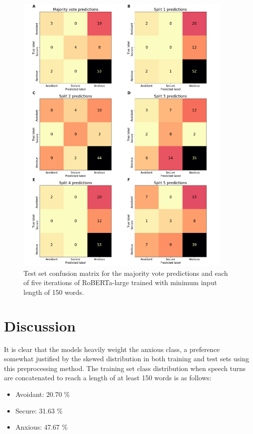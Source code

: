\documentclass[12pt]{report}
\begin{document}
\begin{figure}
    \includegraphics[width=0.95\textwidth]{figures/combined_confusion_matrix.png}
    \caption{Test set confusion matrix for the majority vote predictions and each of five iterations of RoBERTa-large trained with minimum input length of 150 words.}
    \label{fig: all confusion matrices}
\end{figure}

\section{Discussion}
It is clear that the models heavily weight the anxious class, a preference somewhat justified by the skewed distribution in both training and test sets using this preprocessing method.
The training set class distribution when speech turns are concatenated to reach a length of at least 150 words is as follows:
\begin{itemize}
    \item Avoidant: 20.70 \%
    \item Secure: 31.63 \%
    \item Anxious: 47.67 \%
\end{itemize}
\end{document}
